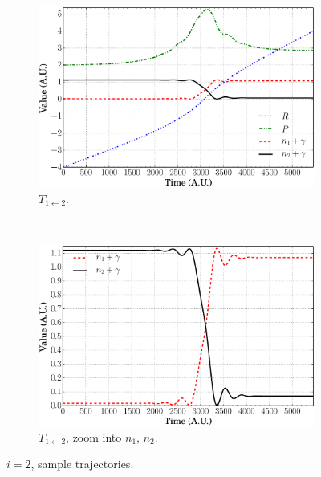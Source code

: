 \documentclass[xetex,mathserif,serif]{beamer}
\newcommand{\tot}{$ T_{1\leftarrow2} $}
\begin{document}
\begin{frame}
{\begin{figure}
\begin{subfigure}[t]{0.45\textwidth}
\includegraphics[width=\textwidth]{sc_traj_t12.eps}
\vspace{-0.1cm}
\caption{{\fontsize{7}{8}\selectfont \tot.}}
\end{subfigure}
~
\begin{subfigure}[t]{0.45\textwidth}
\centering
\includegraphics[width=\textwidth]{sc_traj_t12_e.eps}
\vspace{-0.1cm}
\caption{{\fontsize{7}{8}\selectfont \tot, zoom into $ n_{1}$, $n_{2} $.}}
\end{subfigure}
\caption{$ i = 2 $, sample trajectories.}
\end{figure}
}{}


\end{frame}
\end{document}
